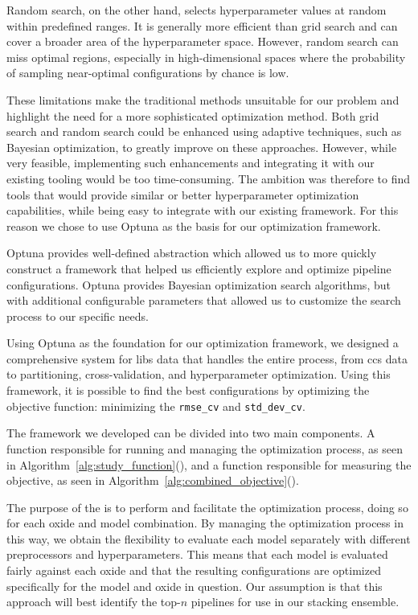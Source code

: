 Random search, on the other hand, selects hyperparameter values at random within predefined ranges.
It is generally more efficient than grid search and can cover a broader area of the hyperparameter space.
However, random search can miss optimal regions, especially in high-dimensional spaces where the probability of sampling near-optimal configurations by chance is low.

These limitations make the traditional methods unsuitable for our problem and highlight the need for a more sophisticated optimization method.
Both grid search and random search could be enhanced using adaptive techniques, such as Bayesian optimization, to greatly improve on these approaches.
However, while very feasible, implementing such enhancements and integrating it with our existing tooling would be too time-consuming.
The ambition was therefore to find tools that would provide similar or better hyperparameter optimization capabilities, while being easy to integrate with our existing framework.
For this reason we chose to use Optuna as the basis for our optimization framework\cite{optuna_2019}.

Optuna provides well-defined abstraction which allowed us to more quickly construct a framework that helped us efficiently explore and optimize pipeline configurations.
Optuna provides Bayesian optimization search algorithms, but with additional configurable parameters that allowed us to customize the search process to our specific needs.

Using Optuna as the foundation for our optimization framework, we designed a comprehensive system for \gls{libs} data that handles the entire process, from \gls{ccs} data to partitioning, cross-validation, and hyperparameter optimization.
Using this framework, it is possible to find the best configurations by optimizing the objective function: minimizing the \texttt{rmse\_cv} and \texttt{std\_dev\_cv}.

The framework we developed can be divided into two main components.
A function responsible for running and managing the optimization process, as seen in Algorithm~\ref{alg:study_function}(), and a function responsible for measuring the objective, as seen in Algorithm~\ref{alg:combined_objective}().

The purpose of the  is to perform and facilitate the optimization process, doing so for each oxide and model combination.
By managing the optimization process in this way, we obtain the flexibility to evaluate each model separately with different preprocessors and hyperparameters.
This means that each model is evaluated fairly against each oxide and that the resulting configurations are optimized specifically for the model and oxide in question.
Our assumption is that this approach will best identify the top-$n$ pipelines for use in our stacking ensemble.

